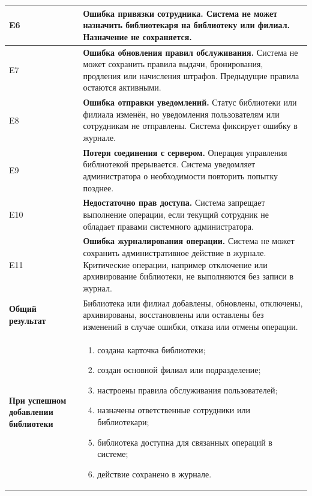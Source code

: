 \documentclass[12pt,a4paper]{article}
\begin{document}
\begin{xltabular}{\textwidth}{
				|>{\raggedright\arraybackslash}p{2.7cm}
				|>{\raggedright\arraybackslash}X|
			}
			E6 &
			\textbf{Ошибка привязки сотрудника.}
			Система не может назначить библиотекаря на библиотеку или филиал.
			Назначение не сохраняется. \\
			\hline
			
			E7 &
			\textbf{Ошибка обновления правил обслуживания.}
			Система не может сохранить правила выдачи, бронирования, продления
			или начисления штрафов. Предыдущие правила остаются активными. \\
			\hline
			
			E8 &
			\textbf{Ошибка отправки уведомлений.}
			Статус библиотеки или филиала изменён, но уведомления пользователям
			или сотрудникам не отправлены. Система фиксирует ошибку в журнале. \\
			\hline
			
			E9 &
			\textbf{Потеря соединения с сервером.}
			Операция управления библиотекой прерывается. Система уведомляет
			администратора о необходимости повторить попытку позднее. \\
			\hline
			
			E10 &
			\textbf{Недостаточно прав доступа.}
			Система запрещает выполнение операции, если текущий сотрудник не
			обладает правами системного администратора. \\
			\hline
			
			E11 &
			\textbf{Ошибка журналирования операции.}
			Система не может сохранить административное действие в журнале.
			Критические операции, например отключение или архивирование
			библиотеки, не выполняются без записи в журнал. \\
			\hline
			
			
			\textbf{Общий результат} &
			Библиотека или филиал добавлены, обновлены, отключены,
			архивированы, восстановлены или оставлены без изменений в случае
			ошибки, отказа или отмены операции. \\
			\hline
			
			\textbf{При успешном добавлении библиотеки} &
			\begin{enumerate}
				\item создана карточка библиотеки;
				\item создан основной филиал или подразделение;
				\item настроены правила обслуживания пользователей;
				\item назначены ответственные сотрудники или библиотекари;
				\item библиотека доступна для связанных операций в системе;
				\item действие сохранено в журнале.
			\end{enumerate} \\
			\hline
			

\end{xltabular}
\end{document}
